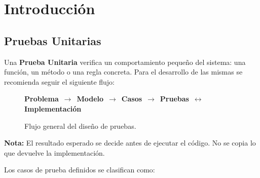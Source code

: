 \documentclass[11pt,letterpaper]{article}
\begin{document}
\setcounter{page}{2}

\hypersetup{pageanchor=true}

\fi



\renewcommand{\contentsname}{Índice}

\renewcommand{\tablename}{Tabla}

\renewcommand{\figurename}{Figura}

\renewcommand{\refname}{Bibliografía}



\tableofcontents

\clearpage




\section{Introducción}
\label{sec:orgac18c16}


\subsection{Pruebas Unitarias}
\label{sec:org2cc13dd}

Una \textbf{Prueba Unitaria} verifica un comportamiento pequeño del sistema: una función, un método o una regla concreta. Para el desarrollo de las mismas se recomienda seguir el siguiente flujo:


\begin{figure}[H]

\centering

{\large
\textbf{Problema}
\,$\longrightarrow$\,
\textbf{Modelo}
\,$\longrightarrow$\,
\textbf{Casos}
\,$\longrightarrow$\,
\textbf{Pruebas}
\,$\longleftrightarrow$\,
\textbf{Implementación}
}

\caption{Flujo general del diseño de pruebas.}

\end{figure}

\textbf{Nota:} El resultado esperado se decide antes de ejecutar el código. No se copia lo que devuelve la implementación.

Los casos de prueba definidos se clasifican como:
\end{document}
